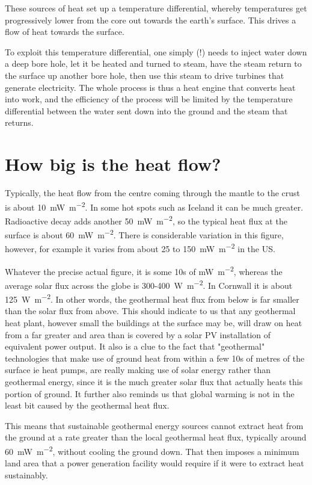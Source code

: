 \documentclass[a4paper,12pt,fleqn]{article}
\begin{document}
These sources of heat set up a temperature differential, whereby temperatures get progressively lower from the core out towards the earth's surface. This drives a flow of heat towards the surface.

To exploit this temperature differential, one simply (!) needs to inject water down a deep bore hole, let it be heated and turned to steam, have the steam return to the surface up another bore hole, then use this steam to drive turbines that generate electricity. The whole process is thus a heat engine that converts heat into work, and the efficiency of the process will be limited by the temperature differential between the water sent down into the ground and the steam that returns.

\section{How big is the heat flow?}
Typically, the heat flow from the centre coming through the mantle to the crust is about \SI{10}{\milli\watt\per\metre\squared}. In some hot spots such as Iceland it can be much greater. Radioactive decay adds another \SI{50}{\milli\watt\per\metre\squared}, so the typical heat flux at the surface is about \SI{60}{\milli\watt\per\metre\squared}. There is considerable variation in this figure, however, for example it varies from about 25 to 150~\si{\milli\watt\per\metre\squared} in the US.

Whatever the precise actual figure, it is some 10s of \si{\milli\watt\per\metre\squared}, whereas the average solar flux across the globe is 300-400~\si{\watt\per\metre\squared}. In Cornwall it is about \SI{125}{\watt\per\metre\squared}. In other words, the geothermal heat flux from below is far smaller than the solar flux from above. This should indicate to us that any geothermal heat plant, however small the buildings at the surface may be, will draw on heat from a far greater and area than is covered by a solar PV installation of equivalent power output. It also is a clue to the fact that "geothermal" technologies that make use of ground heat from within a few 10s of metres of the surface ie heat pumps, are really making use of solar energy rather than geothermal energy, since it is the much greater solar flux that actually heats this portion of ground. It further also reminds us that global warming is not in the least bit caused by the geothermal heat flux.

This means that sustainable geothermal energy sources cannot extract heat from the ground at a rate greater than the local geothermal heat flux, typically around \SI{60}{\milli\watt\per\metre\squared}, without cooling the ground down. That then imposes a minimum land area that a power generation facility would require if it were to extract heat sustainably.
\end{document}
